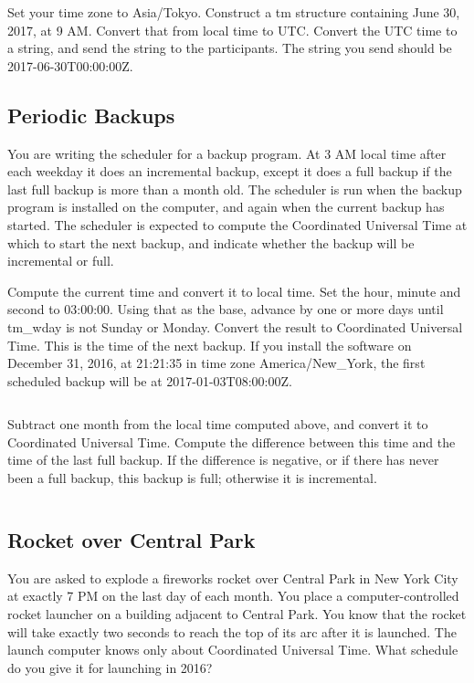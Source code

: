 \documentclass[letterpaper,twoside]{article}
\begin{document}
Set your time zone to Asia/Tokyo.  Construct a {\ttfamily tm} structure
containing June 30, 2017, at 9 AM.  Convert that from local time to UTC.
Convert the UTC time to a string, and send the string to
the participants.  The string you send should be 2017-06-30T00:00:00Z.

\subsection{Periodic Backups}
You are writing the scheduler for a backup program.  At 3 AM
local time
after each weekday it does an incremental backup,
except it does a full backup if the last full backup is more
than a month old.  The scheduler is run when the backup program
is installed on the computer, and again when
the current backup has started.  The scheduler is expected
to compute the Coordinated Universal Time at which to start
the next backup, and indicate whether the backup will be
incremental or full.

Compute the current time and convert it to local time.
Set the hour, minute and second to 03:00:00.
Using that as the base, advance by one or more days
until tm\_wday is not Sunday or Monday.  Convert the result
to Coordinated Universal Time.  This is the time of the
next backup.  If you install the software on December 31, 2016,
at 21:21:35 in time zone America/New\_York, the first
scheduled backup will be at 2017-01-03T08:00:00Z.
\inputminted[firstline=44,lastline=76]{c}{examples/example_02.c}

Subtract one month from the local time computed above, and
convert it to Coordinated Universal Time.  Compute the
difference between this time and the time of the last
full backup.  If the difference is negative, or if there
has never been a full backup, this backup is full;
otherwise it is incremental.
\inputminted[firstline=78,lastline=94]{c}{examples/example_02.c}

\subsection{Rocket over Central Park}
You are asked to explode a fireworks rocket over Central
Park in New York City at exactly 7 PM on the last day of each month.
You place a computer-controlled
rocket launcher on a building adjacent to Central Park.  You know that
the rocket will take exactly two seconds to reach the top of its
arc after it is launched.  The launch computer knows only about Coordinated
Universal Time.  What schedule do you give it for launching in 2016?
\end{document}
